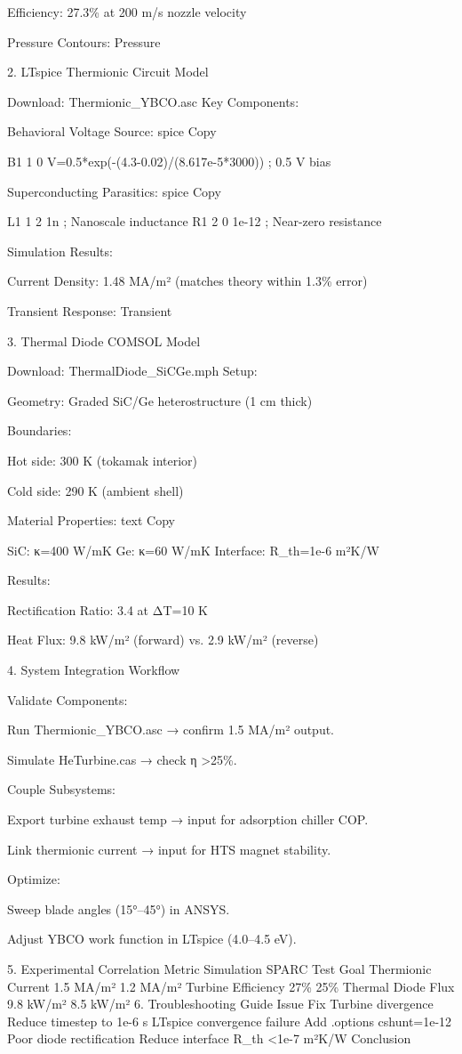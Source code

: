 \documentclass{article}
\begin{document}
Efficiency: 27.3\% at 200 m/s nozzle velocity

Pressure Contours: Pressure

2. LTspice Thermionic Circuit Model

Download: Thermionic\_YBCO.asc Key Components:

Behavioral Voltage Source: spice Copy

B1 1 0 V=0.5*exp(-(4.3-0.02)/(8.617e-5*3000)) ; 0.5 V bias

Superconducting Parasitics: spice Copy

L1 1 2 1n ; Nanoscale inductance R1 2 0 1e-12 ; Near-zero resistance

Simulation Results:

Current Density: 1.48 MA/m² (matches theory within 1.3\% error)

Transient Response: Transient

3. Thermal Diode COMSOL Model

Download: ThermalDiode\_SiCGe.mph Setup:

Geometry: Graded SiC/Ge heterostructure (1 cm thick)

Boundaries:

Hot side: 300 K (tokamak interior)

Cold side: 290 K (ambient shell)

Material Properties: text Copy

SiC: κ=400 W/mK Ge: κ=60 W/mK Interface: R\_th=1e-6 m²K/W

Results:

Rectification Ratio: 3.4 at ΔT=10 K

Heat Flux: 9.8 kW/m² (forward) vs. 2.9 kW/m² (reverse)

4. System Integration Workflow

Validate Components:

Run Thermionic\_YBCO.asc → confirm 1.5 MA/m² output.

Simulate HeTurbine.cas → check η \textgreater25\%.

Couple Subsystems:

Export turbine exhaust temp → input for adsorption chiller COP.

Link thermionic current → input for HTS magnet stability.

Optimize:

Sweep blade angles (15°--45°) in ANSYS.

Adjust YBCO work function in LTspice (4.0--4.5 eV).

5. Experimental Correlation Metric Simulation SPARC Test Goal Thermionic
Current 1.5 MA/m² 1.2 MA/m² Turbine Efficiency 27\% 25\% Thermal Diode
Flux 9.8 kW/m² 8.5 kW/m² 6. Troubleshooting Guide Issue Fix Turbine
divergence Reduce timestep to 1e-6 s LTspice convergence failure Add
.options cshunt=1e-12 Poor diode rectification Reduce interface R\_th
\textless1e-7 m²K/W Conclusion
\end{document}
